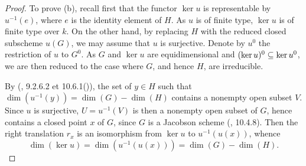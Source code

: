 \begin{proof}
To prove (b), recall first that the functor $\ker u$ is representable by $u^{-1}(e)$, where $e$ is the identity element of $H$. As $u$ is of finite type, $\ker u$ is of finite type over $k$. On the other hand, by replacing $H$ with the reduced closed subscheme $u(G)$, we may assume that $u$ is surjective. Denote by $u^0$ the restriction of $u$ to $G^0$. As $G$ and $\ker u$ are equidimensional and $(\operatorname{ker} u)^0\subseteq\operatorname{ker} u^0$, we are then reduced to the case where $G$, and hence $H$, are irreducible.\par
By (\cite{EGA4-3}, 9.2.6.2 et 10.6.1()), the set of $y\in H$ such that $\dim(u^{-1}(y))=\dim(G)-\dim(H)$ contains a nonempty open subset $V$. Since $u$ is surjective, $U=u^{-1}(V)$ is then a nonempty open subset of $G$, hence contains a closed point $x$ of $G$, since $G$ is a Jacobson scheme (\cite{EGA4-3}, 10.4.8). Then the right translation $r_x$ is an isomorphism from $\ker u$ to $u^{-1}(u(x))$, whence
\[\dim(\ker u)=\dim(u^{-1}(u(x)))=\dim(G)-\dim(H).\]


\end{proof}
